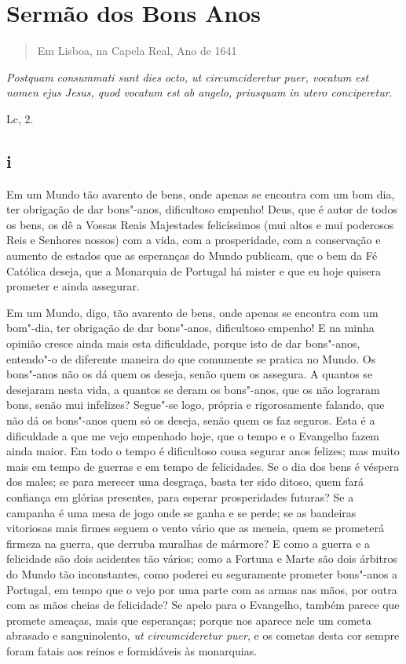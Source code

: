 \chapter{Sermão dos Bons Anos}

\begin{quotation}
\noindent{}Em Lisboa, na Capela Real, Ano de 1641
\end{quotation}

\epigraph{\emph{Postquam consummati sunt dies octo, ut circumcideretur puer,
vocatum est nomen ejus Jesus, quod vocatum est ab angelo, priusquam in
utero conciperetur}.}{Lc, 2.}

\section{i}

\noindent{}Em um Mundo tão avarento de bens, onde apenas se encontra com um bom
dia, ter obrigação de dar bons"-anos, dificultoso empenho! Deus, que é
autor de todos os bens, os dê a Vossas Reais Majestades felicíssimos
(mui altos e mui poderosos Reis e Senhores nossos) com a vida, com a
prosperidade, com a conservação e aumento de estados que as esperanças
do Mundo publicam, que o bem da Fé Católica deseja, que a Monarquia de
Portugal há mister e que eu hoje quisera prometer e ainda assegurar.

Em um Mundo, digo, tão avarento de bens, onde apenas se encontra com um
bom"-dia, ter obrigação de dar bons"-anos, dificultoso empenho! E na minha
opinião cresce ainda mais esta dificuldade, porque isto de dar
bons"-anos, entendo"-o de diferente maneira do que comumente se pratica no
Mundo. Os bons"-anos não os dá quem os deseja, senão quem os assegura. A
quantos se desejaram nesta vida, a quantos se deram os bons"-anos, que os
não lograram bons, senão mui infelizes? Segue"-se logo, própria e
rigorosamente falando, que não dá os bons"-anos quem só os deseja, senão
quem os faz seguros. Esta é a dificuldade a que me vejo empenhado hoje,
que o tempo e o Evangelho fazem ainda maior. Em todo o tempo é
dificultoso cousa segurar anos felizes; mas muito mais em tempo de
guerras e em tempo de felicidades. Se o dia dos bens é véspera dos
males; se para merecer uma desgraça, basta ter sido ditoso, quem fará
confiança em glórias presentes, para esperar prosperidades futuras? Se a
campanha é uma mesa de jogo onde se ganha e se perde; se as bandeiras
vitoriosas mais firmes seguem o vento vário que as meneia, quem se
prometerá firmeza na guerra, que derruba muralhas de mármore? E como a
guerra e a felicidade são dois acidentes tão vários; como a Fortuna e
Marte são dois árbitros do Mundo tão inconstantes, como poderei eu
seguramente prometer bons"-anos a Portugal, em tempo que o vejo por uma
parte com as armas nas mãos, por outra com as mãos cheias de felicidade?
Se apelo para o Evangelho, também parece que promete ameaças, mais que
esperanças; porque nos aparece nele um cometa abrasado e sanguinolento,
\emph{ut circumcideretur puer}, e os cometas desta cor sempre foram
fatais aos reinos e formidáveis às monarquias.

